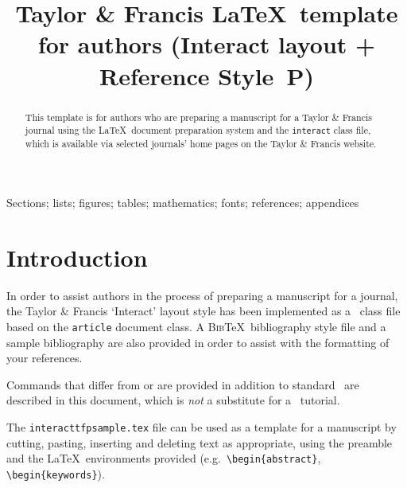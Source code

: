 \documentclass[]{interact}
\theoremstyle{plain}%
\theoremstyle{definition}
\theoremstyle{remark}
\begin{document}

\title{Taylor \& Francis \LaTeX\ template for authors (\textsf{Interact} layout + Reference Style~P)}

\author{
}

\maketitle

\begin{abstract}
This template is for authors who are preparing a manuscript for a Taylor \& Francis journal using the \LaTeX\ document preparation system and the \texttt{interact} class file, which is available via selected journals' home pages on the Taylor \& Francis website.
\end{abstract}

\begin{keywords}
Sections; lists; figures; tables; mathematics; fonts; references; appendices
\end{keywords}

\section{Introduction}

In order to assist authors in the process of preparing a manuscript for a journal, the Taylor \& Francis `\textsf{Interact}' layout style has been implemented as a \LaTeXe\ class file based on the \texttt{article} document class. A \textsc{Bib}\TeX\ bibliography style file and a sample bibliography are also provided in order to assist with the formatting of your references.

Commands that differ from or are provided in addition to standard \LaTeXe\ are described in this document, which is \emph{not} a substitute for a \LaTeXe\ tutorial.

The \texttt{interacttfpsample.tex} file can be used as a template for a manuscript by cutting, pasting, inserting and deleting text as appropriate, using the preamble and the \LaTeX\ environments provided (e.g.\ \verb"\begin{abstract}", \verb"\begin{keywords}").
\end{document}
